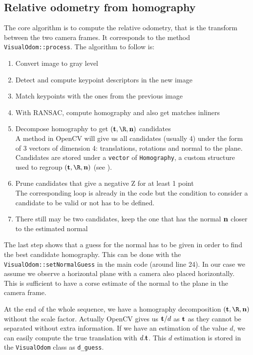 \documentclass{ecnreport}
\begin{document}
\subsection{Relative odometry from homography}

The core algorithm is to compute the relative odometry, that is the transform between the two camera frames. It corresponds to the method \texttt{VisualOdom::process}.
The algorithm to follow is:
\begin{enumerate}
  \item Convert image to gray level
 \item Detect and compute keypoint descriptors in the new image
 \item Match keypoints with the ones from the previous image
 \item With RANSAC, compute homography and also get matches inliners 
 \item Decompose homography to get $(\t,\R,\n)$ candidates\\
  A method in OpenCV
will give us all candidates (usually 4) under the form of 3 vectors of dimension 4: translations, rotations and normal to the plane. Candidates 
are stored under a \texttt{vector} of \texttt{Homography}, a custom structure used to regroup $(\t,\R,\n)$ (see ).
 \item Prune candidates that give a negative Z for at least 1 point \\ The corresponding loop is already in the code but the condition to consider a candidate to be valid or not has to be defined.
 \item There still may be two candidates, keep the one that has the normal $\mathbf{n}$ closer to the estimated normal
\end{enumerate}
The last step shows that a guess for the normal has to be given in order to find the best candidate homography. This can be done with the \texttt{VisualOdom::setNormalGuess} in the main code (around line 24). In our case we assume
we observe a horizontal plane with a camera also placed horizontally. This is sufficient to have a corse estimate of the normal to the plane in the camera frame.

At the end of the whole sequence, we have a homography decomposition $(\t,\R,\n)$ without the scale factor. Actually OpenCV gives us $\mathbf{t}/d$ as $\mathbf{t}$ as they cannot be separated without
extra information. If we have an estimation of the value $d$, we can easily compute the true translation with $d.\mathbf{t}$. This $d$ estimation is stored in the \texttt{VisualOdom} class as \texttt{d\_guess}.
\end{document}

